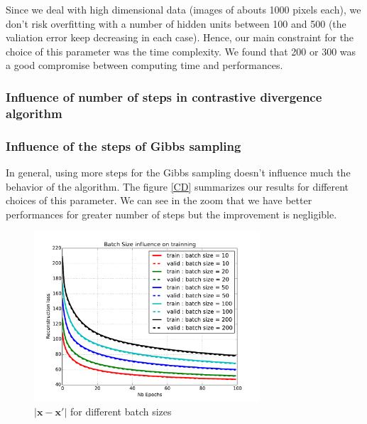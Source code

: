 \documentclass{article}
\begin{document}
Since we deal with high dimensional data (images of abouts 1000 pixels each), we don't risk overfitting with a number of hidden units between 100 and 500 (the valiation error keep decreasing in each case). Hence, our main constraint for the choice of this parameter was the time complexity. We found that 200 or 300 was a good compromise between computing time and performances.



\subsubsection{Influence of number of steps in contrastive divergence algorithm}
\label{subsubsec:CDk}

\subsubsection{Influence of the steps of Gibbs sampling}

In general, using more steps for the Gibbs sampling doesn't influence much the behavior of the algorithm. The figure \ref{CD} summarizes our results for different choices of this parameter. We can see in the zoom that we have better performances for greater number of steps but the improvement is negligible.

\begin{figure}
\centering
\includegraphics[width=0.75\textwidth]{batchsize}
\caption{$\lvert \mathbf{x} - \mathbf{x'} \rvert$ for different batch sizes}
\label{fig:batch}
\end{figure}
\end{document}

